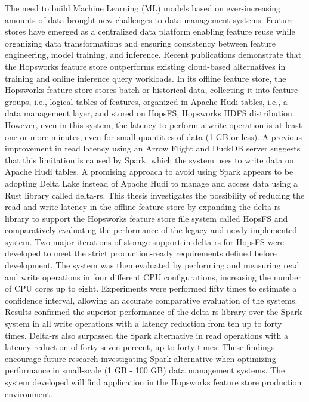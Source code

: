 \begin{scontents}[store-env=abstracts,print-env=true]
The need to build Machine Learning (ML) models based on ever-increasing amounts of data brought new challenges to data management systems. Feature stores have emerged as a centralized data platform enabling feature reuse while organizing data transformations and ensuring consistency between feature engineering, model training, and inference. Recent publications demonstrate that the Hopsworks feature store outperforms existing cloud-based alternatives in training and online inference query workloads. In its offline feature store, the Hopsworks feature store stores batch or historical data, collecting it into feature groups, i.e., logical tables of features, organized in Apache Hudi tables, i.e., a data management layer, and stored on HopsFS, Hopsworks HDFS distribution. However, even in this system, the latency to perform a write operation is at least one or more minutes, even for small quantities of data (1 GB or less). A previous improvement in read latency using an Arrow Flight and DuckDB server suggests that this limitation is caused by Spark, which the system uses to write data on Apache Hudi tables. 
A promising approach to avoid using Spark appears to be adopting Delta Lake instead of Apache Hudi to manage and access data using a Rust library called delta-rs. This thesis investigates the possibility of reducing the read and write latency in the offline feature store by expanding the delta-rs library to support the Hopsworks feature store file system called HopsFS and comparatively evaluating the performance of the legacy and newly implemented system. Two major iterations of storage support in delta-rs for HopsFS were developed to meet the strict production-ready requirements defined before development. The system was then evaluated by performing and measuring read and write operations in four different CPU configurations, increasing the number of CPU cores up to eight. Experiments were performed fifty times to estimate a confidence interval, allowing an accurate comparative evaluation of the systems. Results confirmed the superior performance of the delta-rs library over the Spark system in all write operations with a latency reduction from ten up to forty times. Delta-rs also surpassed the Spark alternative in read operations with a latency reduction of forty-seven percent, up to forty times. These findings encourage future research investigating Spark alternative when optimizing performance in small-scale (1 GB - 100 GB) data management systems. The system developed will find application in the Hopsworks feature store production environment.
\end{scontents}
